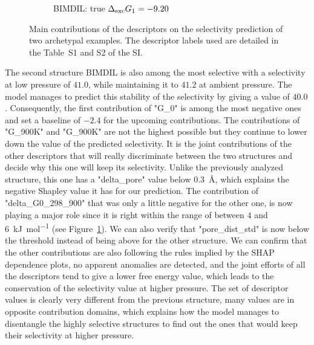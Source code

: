 \documentclass[main]{subfiles}
\begin{document}
\begin{figure}[ht]
\begin{subfigure}[b]{0.47\textwidth}
      \caption{BIMDIL: true $\Delta_{\text{exc}} G_1=-9.20$}
    \end{subfigure}
  \caption{Main contributions of the descriptors on the selectivity prediction of two archetypal examples. The descriptor labels used are detailed in the Table~S1 and S2 of the SI.}
  \label{fgr:contribution}
\end{figure}

The second structure BIMDIL is also among the most selective with a selectivity at low pressure of $41.0$, while maintaining it to $41.2$ at ambient pressure. The model manages to predict this stability of the selectivity by giving a value of $40.0$. Consequently, the first contribution of "G\_0" is among the most negative ones and set a baseline of $-2.4$ for the upcoming contributions. The contributions of "G\_900K" and "G\_900K" are not the highest possible but they continue to lower down the value of the predicted selectivity. It is the joint contributions of the other descriptors that will really discriminate between the two structures and decide why this one will keep its selectivity. Unlike the previously analyzed structure, this one has a "delta\_pore" value below \SI{0.3}{\angstrom}, which explains the negative Shapley value it has for our prediction. The contribution of "delta\_G0\_298\_900" that was only a little negative for the other one, is now playing a major role since it is right within the range of between $4$ and \SI{6}{\kilo\joule\per\mole} (see Figure~\ref{fgr:contribution}). We can also verify that "pore\_dist\_std" is now below the threshold instead of being above for the other structure. We can confirm that the other contributions are also following the rules implied by the SHAP dependence plots, no apparent anomalies are detected, and the joint efforts of all the descriptors tend to give a lower free energy value, which leads to the conservation of the selectivity value at higher pressure. The set of descriptor values is clearly very different from the previous structure, many values are in opposite contribution domains, which explains how the model manages to disentangle the highly selective structures to find out the ones that would keep their selectivity at higher pressure.
\end{document}
